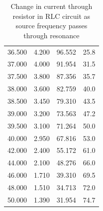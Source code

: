 \documentclass[12pt]{article}
\begin{document}
\begin{table}[h]
\begin{tabular}{@{}SSSS@{}}
36.500 & 4.200 & 96.552  & 25.8  \\
37.000 & 4.000 & 91.954  & 31.5  \\
37.500 & 3.800 & 87.356  & 35.7  \\
38.000 & 3.600 & 82.759  & 40.0  \\
38.500 & 3.450 & 79.310  & 43.5  \\
39.000 & 3.200 & 73.563  & 47.2  \\
39.500 & 3.100 & 71.264  & 50.0  \\
40.000 & 2.950 & 67.816  & 53.0  \\
42.000 & 2.400 & 55.172  & 61.0  \\
44.000 & 2.100 & 48.276  & 66.0  \\
46.000 & 1.710 & 39.310  & 69.5  \\
48.000 & 1.510 & 34.713  & 72.0  \\
50.000 & 1.390 & 31.954  & 74.7  \\ 
\bottomrule
\end{tabular}
\caption{Change in current through resistor in RLC circuit as source frequency passes through resonance}
\label{table:resonance}
\end{table}
\end{document}
